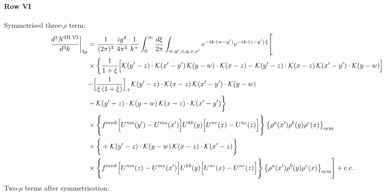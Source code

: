 \documentclass[9pt]{article}
\numberwithin{equation}{section}
\begin{document}
\paragraph*{Row VI}
Symmetrised three-$\rho$ term:
\begin{align}
\frac{d^{3}N^{\rm III.VI}}{d^{3}k}\bigg|_{3\rho}&=\frac{1}{(2\pi)^{3}}\,\frac{ig^{4}}{4\pi^{4}}\,\frac{1}{k^{+}}\int_{0}^{\infty}\frac{d\xi}{2\pi}\int_{w,y',z,y,x,x'}e^{-ik\cdot(w-y')}e^{-ik\cdot(z-y')\,\xi}\Bigg[\notag\\
&\times\bigg\{\frac{1}{1+\xi}\Big[\mathcal{K}(y'-z)\cdot\mathcal{K}(x'-y')\,\mathcal{K}(y-w)\cdot\mathcal{K}(x-z)-\mathcal{K}(y'-z)\cdot\mathcal{K}(x-z)\,\mathcal{K}(x'-y')\cdot\mathcal{K}(y-w)\Big]\notag\\
&{-\Big[\frac{1}{\xi\,(1+\xi)}\Big]_{+}\mathcal{K}(y'-z)\cdot\mathcal{K}(x-z)\,\mathcal{K}(x'-y')\cdot\mathcal{K}(y-w)}\notag\\
&-\mathcal{K}(y'-z)\cdot\mathcal{K}(y-w)\,\mathcal{K}(x-z)\cdot\mathcal{K}(x'-y')\bigg\}\notag\\
&\times \Bigg\{f^{mnk}\Big[U^{ma}(y')-U^{ma}(x')\Big]U^{kb}(y)\Big[U^{nc}(x)-U^{nc}(z)\Big]\Bigg\}\,\big\{\rho^{a}(x')\rho^{b}(y)\rho^{c}(x)\big\}_{\rm sym}\notag\\
&+\bigg\{+\mathcal{K}(y'-z)\cdot\mathcal{K}(y-w)\,\mathcal{K}(x-z)\cdot\mathcal{K}(x'-z)\bigg\}\notag\\
&\times \Bigg\{f^{mnk}\Big[U^{ma}(z)-U^{ma}(x')\Big]U^{kb}(y)\Big[U^{nc}(x)-U^{nc}(z)\Big]\Bigg\}\,\big\{\rho^{a}(x')\rho^{b}(y)\rho^{c}(x)\big\}_{\rm sym}\Bigg]+{\rm c.c.}\label{eq:H-III.VI-3}
\end{align}
Two-$\rho$ terms after symmetrisation:
\end{document}
